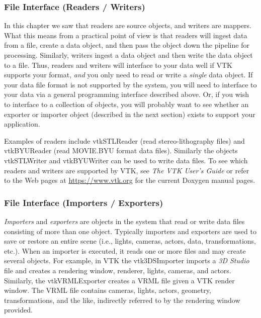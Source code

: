 \subsubsection{File Interface (Readers / Writers)}
\label{subsubsec:file_interface_readers_writers}

In this chapter we saw that readers are source objects, and writers are mappers. What this means from a practical point of view is that readers will ingest data from a file, create a data object, and then pass the object down the pipeline for processing. Similarly, writers ingest a data object and then write the data object to a file. Thus, readers and writers will interface to your data well if VTK supports your format, \emph{and} you only need to read or write a \emph{single} data object. If your data file format is not supported by the system, you will need to interface to your data via a general programming interface described above. Or, if you wish to interface to a collection of objects, you will probably want to see whether an exporter or importer object (described in the next section) exists to support your application.

Examples of readers include vtkSTLReader (read stereo-lithography files) and vtkBYUReader (read MOVIE.BYU format data files). Similarly the objects vtkSTLWriter and vtkBYUWriter can be used to write data files. To see which readers and writers are supported by VTK, see \emph{The VTK User's Guide} or refer to the Web pages at \href{https://www.vtk.org}{https://www.vtk.org} for the current Doxygen manual pages.

\subsubsection{File Interface (Importers / Exporters)}
\label{subsubsec:file_interface_importers_exporters}

\emph{Importers} and \emph{exporters} are objects in the system that read or write data files consisting of more than one object. Typically importers and exporters are used to save or restore an entire scene (i.e., lights, cameras, actors, data, transformations, etc.). When an importer is executed, it reads one or more files and may create several objects. For example, in VTK the vtk3DSImporter imports a \emph{3D Studio} file and creates a rendering window, renderer, lights, cameras, and actors. Similarly, the vtkVRMLExporter creates a VRML file given a VTK render window. The VRML file contains cameras, lights, actors, geometry, transformations, and the like, indirectly referred to by the rendering window provided.

